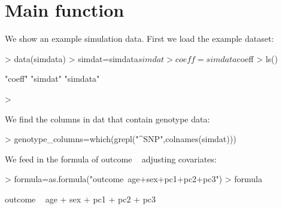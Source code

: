 \documentclass[12pt]{article}
\begin{document}
\section{Main function}

We show an example simulation data. 
First we load the example dataset:
\begin{Schunk}
\begin{Sinput}
> data(simdata)
> simdat=simdata$simdat
> coeff=simdata$coeff
> ls()
\end{Sinput}
\begin{Soutput}
[1] "coeff"   "simdat"  "simdata"
\end{Soutput}
\begin{Sinput}
> 
\end{Sinput}
\end{Schunk}

We find the columns in dat that contain genotype data:
\begin{Schunk}
\begin{Sinput}
> genotype_columns=which(grepl("^SNP",colnames(simdat)))
\end{Sinput}
\end{Schunk}

We feed in the formula of outcome ~ adjusting covariates:
\begin{Schunk}
\begin{Sinput}
> formula=as.formula("outcome~age+sex+pc1+pc2+pc3")
> formula
\end{Sinput}
\begin{Soutput}
outcome ~ age + sex + pc1 + pc2 + pc3
\end{Soutput}
\end{Schunk}
\end{document}
